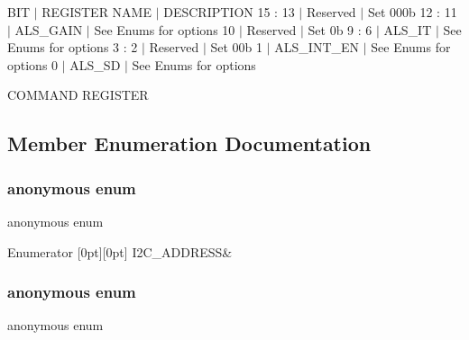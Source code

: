 B\+IT $\vert$ R\+E\+G\+I\+S\+T\+ER N\+A\+ME $\vert$ D\+E\+S\+C\+R\+I\+P\+T\+I\+ON 15 \+: 13 $\vert$ Reserved $\vert$ Set 000b 12 \+: 11 $\vert$ A\+L\+S\+\_\+\+G\+A\+IN $\vert$ See Enums for options 10 $\vert$ Reserved $\vert$ Set 0b 9 \+: 6 $\vert$ A\+L\+S\+\_\+\+IT $\vert$ See Enums for options 3 \+: 2 $\vert$ Reserved $\vert$ Set 00b 1 $\vert$ A\+L\+S\+\_\+\+I\+N\+T\+\_\+\+EN $\vert$ See Enums for options 0 $\vert$ A\+L\+S\+\_\+\+SD $\vert$ See Enums for options

C\+O\+M\+M\+A\+ND R\+E\+G\+I\+S\+T\+ER 

\subsection{Member Enumeration Documentation}
\mbox{\label{classVEML7700_ab63c7a3f732769f87046a7fe517fa5d2}} 
\subsubsection{\texorpdfstring{anonymous enum}{anonymous enum}}
{\footnotesize\ttfamily anonymous enum\hspace{0.3cm}{\ttfamily [private]}}

\begin{DoxyEnumFields}{Enumerator}
[0pt][0pt]{}\mbox{\label{classVEML7700_ab63c7a3f732769f87046a7fe517fa5d2a89ac7a0c3d5299cc896db94f3f11ad3b}} 
I2\+C\+\_\+\+A\+D\+D\+R\+E\+SS&\\
\hline

\end{DoxyEnumFields}
\mbox{\label{classVEML7700_a4173dfe44f2cce96da124bdecab4cea9}} 
\subsubsection{\texorpdfstring{anonymous enum}{anonymous enum}}
{\footnotesize\ttfamily anonymous enum\hspace{0.3cm}{\ttfamily [private]}}

